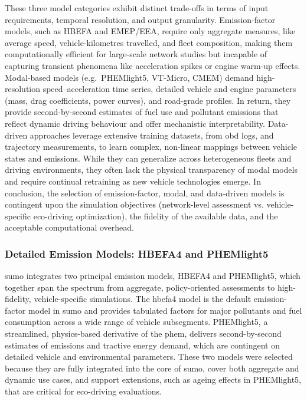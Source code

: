 These three model categories exhibit distinct trade-offs in terms of input requirements, temporal resolution, and output granularity. Emission-factor models, such as HBEFA and EMEP/EEA, require only aggregate measures, like average speed, vehicle-kilometres travelled, and fleet composition, making them computationally efficient for large-scale network studies but incapable of capturing transient phenomena like acceleration spikes or engine warm-up effects. Modal-based models (e.g.\ PHEMlight5, VT-Micro, CMEM) demand high-resolution speed–acceleration time series, detailed vehicle and engine parameters (mass, drag coefficients, power curves), and road-grade profiles. In return, they provide second-by-second estimates of fuel use and pollutant emissions that reflect dynamic driving behaviour and offer mechanistic interpretability. Data-driven approaches leverage extensive training datasets, from \ac{obd} logs, and trajectory measurements, to learn complex, non-linear mappings between vehicle states and emissions. While they can generalize across heterogeneous fleets and driving environments, they often lack the physical transparency of modal models and require continual retraining as new vehicle technologies emerge. In conclusion, the selection of emission-factor, modal, and data-driven models is contingent upon the simulation objectives (network-level assessment vs. vehicle-specific eco-driving optimization), the fidelity of the available data, and the acceptable computational overhead.  

\subsubsection{Detailed Emission Models: HBEFA4 and PHEMlight5}
\label{subsubsec:detailed_emission_models}

\ac{sumo} integrates two principal emission models, HBEFA4 and PHEMlight5, which together span the spectrum from aggregate, policy-oriented assessments to high-fidelity, vehicle-specific simulations. The \ac{hbefa}4 model is the default emission-factor model in \ac{sumo} and provides tabulated factors for major pollutants and fuel consumption across a wide range of vehicle subsegments. PHEMlight5, a streamlined, physics-based derivative of the \ac{phem}, delivers second-by-second estimates of emissions and tractive energy demand, which are contingent on detailed vehicle and environmental parameters. These two models were selected because they are fully integrated into the core of \ac{sumo}, cover both aggregate and dynamic use cases, and support extensions, such as ageing effects in PHEMlight5, that are critical for eco-driving evaluations. \cite{Krajzewicz2002}

